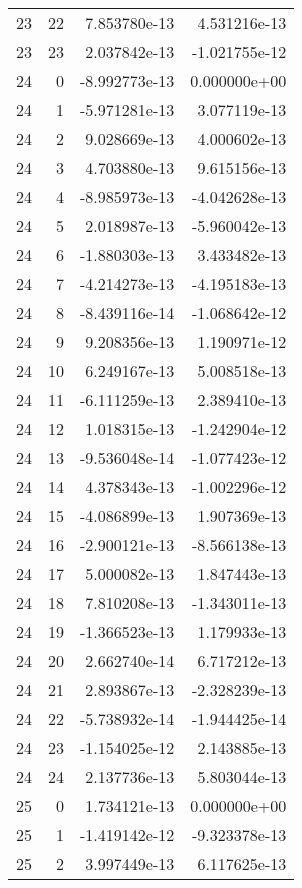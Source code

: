 \begin{tabular}{rrrr}
  23 &   22 &  7.853780e-13 &  4.531216e-13 \\
  23 &   23 &  2.037842e-13 & -1.021755e-12 \\
  24 &    0 & -8.992773e-13 &  0.000000e+00 \\
  24 &    1 & -5.971281e-13 &  3.077119e-13 \\
  24 &    2 &  9.028669e-13 &  4.000602e-13 \\
  24 &    3 &  4.703880e-13 &  9.615156e-13 \\
  24 &    4 & -8.985973e-13 & -4.042628e-13 \\
  24 &    5 &  2.018987e-13 & -5.960042e-13 \\
  24 &    6 & -1.880303e-13 &  3.433482e-13 \\
  24 &    7 & -4.214273e-13 & -4.195183e-13 \\
  24 &    8 & -8.439116e-14 & -1.068642e-12 \\
  24 &    9 &  9.208356e-13 &  1.190971e-12 \\
  24 &   10 &  6.249167e-13 &  5.008518e-13 \\
  24 &   11 & -6.111259e-13 &  2.389410e-13 \\
  24 &   12 &  1.018315e-13 & -1.242904e-12 \\
  24 &   13 & -9.536048e-14 & -1.077423e-12 \\
  24 &   14 &  4.378343e-13 & -1.002296e-12 \\
  24 &   15 & -4.086899e-13 &  1.907369e-13 \\
  24 &   16 & -2.900121e-13 & -8.566138e-13 \\
  24 &   17 &  5.000082e-13 &  1.847443e-13 \\
  24 &   18 &  7.810208e-13 & -1.343011e-13 \\
  24 &   19 & -1.366523e-13 &  1.179933e-13 \\
  24 &   20 &  2.662740e-14 &  6.717212e-13 \\
  24 &   21 &  2.893867e-13 & -2.328239e-13 \\
  24 &   22 & -5.738932e-14 & -1.944425e-14 \\
  24 &   23 & -1.154025e-12 &  2.143885e-13 \\
  24 &   24 &  2.137736e-13 &  5.803044e-13 \\
  25 &    0 &  1.734121e-13 &  0.000000e+00 \\
  25 &    1 & -1.419142e-12 & -9.323378e-13 \\
  25 &    2 &  3.997449e-13 &  6.117625e-13 \\

\end{tabular}
